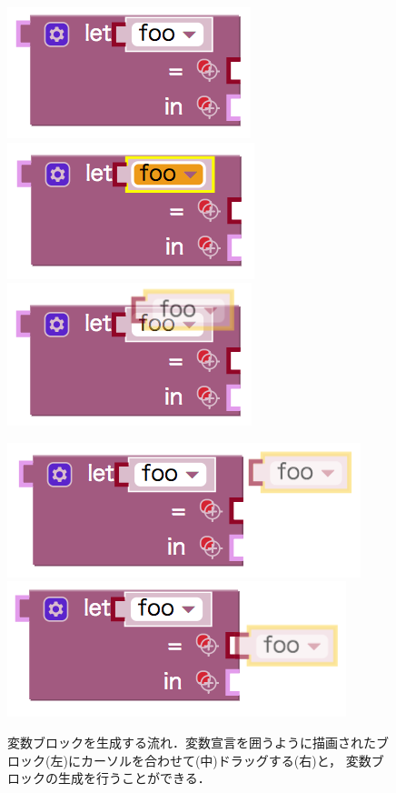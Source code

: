 \begin{figure}[H]
 \centering
 \includegraphics[keepaspectratio, scale=0.3]{img/boundFoo0.png}
 \includegraphics[keepaspectratio, scale=0.3]{img/boundFoo1.png}
 \includegraphics[keepaspectratio, scale=0.3]{img/boundFoo2.png}
 \caption{変数ブロックを生成する流れ．変数宣言を囲うように描画されたブロック(左)にカーソルを合わせて(中)ドラッグする(右)と，
変数ブロックの生成を行うことができる．\label{fig:boundFoo}}
 \includegraphics[keepaspectratio, scale=0.3]{img/refBlock0.png}
 \includegraphics[keepaspectratio, scale=0.3]{img/refBlock1.png}

\end{figure}

